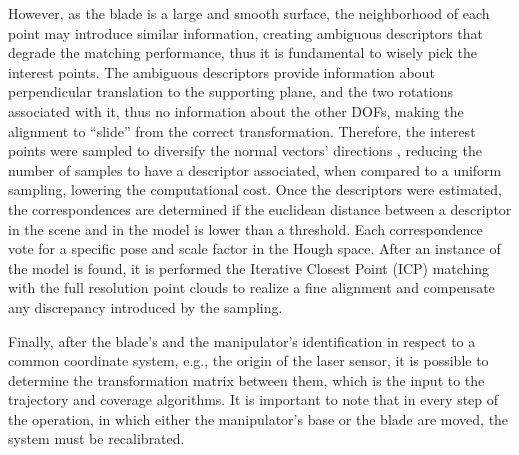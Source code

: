 However, as the blade is a large and smooth surface, the neighborhood of each
point may introduce similar information, creating ambiguous descriptors that
degrade the matching performance, thus it is fundamental to wisely pick the
interest points.
The ambiguous descriptors provide information about perpendicular translation to
the supporting plane, and the two rotations associated with it, thus no
information about the other DOFs, making the alignment to ``slide'' from the
correct transformation. Therefore, the interest points were sampled to diversify
the normal vectors' directions \cite{Rusinkiewicz2001}, reducing the number of
samples to have a descriptor associated, when compared to a uniform sampling,
lowering the computational cost. Once the descriptors were estimated, the
correspondences are determined if the euclidean distance between a descriptor in
the scene and in the model is lower than a threshold. Each correspondence vote
for a specific pose and scale factor in the Hough space. After an instance of
the model is found, it is performed the Iterative Closest Point (ICP) matching
with the full resolution point clouds to realize a fine alignment and compensate
any discrepancy introduced by the sampling. 

Finally, after the blade's and the
manipulator's identification in respect to a common coordinate system, e.g., the
origin of the laser sensor, it is possible to determine the transformation
matrix between them, which is the input to the trajectory and coverage algorithms. It
is important to note that in every step of the operation, in which either the
manipulator's base or the blade are moved, the system must be recalibrated.




